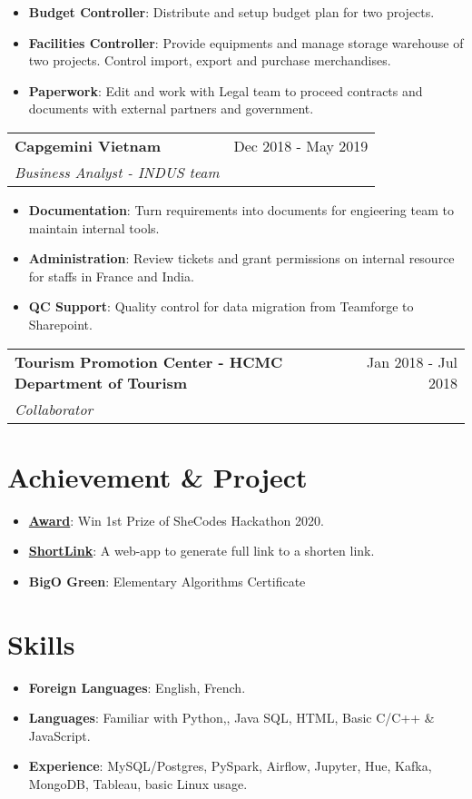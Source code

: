 \documentclass[letterpaper,11pt]{article}
\makeatletter
\newcommand{\resumeItem}[2]{
  \item\small{
    \textbf{#1}{: #2 \vspace{-2pt}}
  }
}
\newcommand{\resumeSubheading}[4]{
  \vspace{-1pt}
  \item
    \begin{tabular*}{0.97\textwidth}{l@{\extracolsep{\fill}}r}
      \textbf{#1} & #2 \\
      \textit{\small#3} & \textit{\small #4} \\
    \end{tabular*}\vspace{-5pt}
}
\newcommand{\resumeSubItem}[2]{\resumeItem{#1}{#2}\vspace{-4pt}}
\newcommand{\resumeSubHeadingListStart}{\begin{itemize}[leftmargin=*]}
\newcommand{\resumeSubHeadingListEnd}{\end{itemize}}
\newcommand{\resumeItemListStart}{\begin{itemize}}
\newcommand{\resumeItemListEnd}{\end{itemize}\vspace{-5pt}}
\makeatother
\begin{document}
      \resumeItemListStart
        \resumeItem{Budget Controller}
          {Distribute and setup budget plan for two projects.} 
        \resumeItem{Facilities Controller}
          {Provide equipments and manage storage warehouse of two projects. Control import, export and purchase merchandises.}
        \resumeItem{Paperwork}
          {Edit and work with Legal team to proceed contracts and documents with external partners and government.}
      \resumeItemListEnd
      
    \resumeSubheading
      {Capgemini Vietnam}{Dec 2018 - May 2019}
      {Business Analyst - INDUS team}{}
      \resumeItemListStart
        \resumeItem{Documentation}
          {Turn requirements into documents for engieering team to maintain internal tools.} 
        \resumeItem{Administration}
            {Review tickets and grant permissions on internal resource for staffs in France and India.}
        \resumeItem{QC Support}    
            {Quality control for data migration from Teamforge to Sharepoint. }
      \resumeItemListEnd


    \resumeSubheading
      {Tourism Promotion Center - HCMC Department of Tourism}{Jan 2018 - Jul 2018}
      {Collaborator}
\resumeSubHeadingListEnd
  
  
\section{Achievement \& Project}
  \resumeSubHeadingListStart 
    \resumeSubItem{\href{}{Award}}
      {Win 1st Prize of SheCodes Hackathon 2020. }
    \resumeSubItem{\href{https://github.com/tuyen-nnt/shortenLink}{ShortLink}}
      {A web-app to generate full link to a shorten link.}
    \resumeSubItem{BigO Green}
      {Elementary Algorithms Certificate}
\resumeSubHeadingListEnd


\section{Skills}
  \resumeSubHeadingListStart
    \resumeSubItem{Foreign Languages}
      {English, French.}
    \resumeSubItem{Languages}
      {Familiar with Python,, Java SQL, HTML, Basic C/C++ & JavaScript.}
    \resumeSubItem{Experience}
      {MySQL/Postgres, PySpark, Airflow, Jupyter, Hue, Kafka, MongoDB, Tableau, basic Linux usage.}
\resumeSubHeadingListEnd
\end{document}
